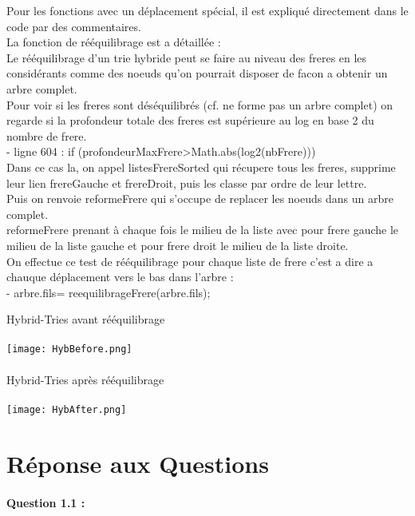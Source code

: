 \documentclass{article}
\begin{document}
Pour les fonctions avec un d\'eplacement sp\'ecial, il est expliqu\'e directement dans
 le code par des commentaires.\\

La fonction de r\'e\'equilibrage est a d\'etaill\'ee :\\
Le r\'e\'equilibrage d'un trie hybride peut se faire au niveau des freres en les
consid\'erants comme des noeuds qu'on pourrait disposer de facon a obtenir un
arbre complet.\\
Pour voir si les freres sont d\'es\'equilibr\'es (cf. ne forme pas un arbre complet)
on regarde si la profondeur totale des freres est sup\'erieure au log en base 2 du
nombre de frere.\\
- ligne 604 : if (profondeurMaxFrere>Math.abs(log2(nbFrere)))\\
Dans ce cas la, on appel listesFrereSorted qui r\'ecupere tous les freres, supprime
leur lien frereGauche et frereDroit, puis les classe par ordre de leur lettre.\\
Puis on renvoie reformeFrere qui s'occupe de replacer les noeuds dans un arbre
complet.\\
reformeFrere prenant à chaque fois le milieu de la liste avec pour frere gauche
le milieu de la liste gauche et pour frere droit le milieu de la liste droite.\\
On effectue ce test de r\'e\'equilibrage pour chaque liste de frere c'est a dire a
chauque d\'eplacement vers le bas dans l'arbre :\\
- arbre.fils= reequilibrageFrere(arbre.fils);\\

\newpage

Hybrid-Tries avant r\'e\'equilibrage\\\\
\texttt{[image: HybBefore.png]}
\\\\
Hybrid-Tries apr\`es r\'e\'equilibrage\\\\
\texttt{[image: HybAfter.png]}

\newpage

\section{R\'eponse aux Questions}

\paragraph{Question 1.1 : }
\end{document}
